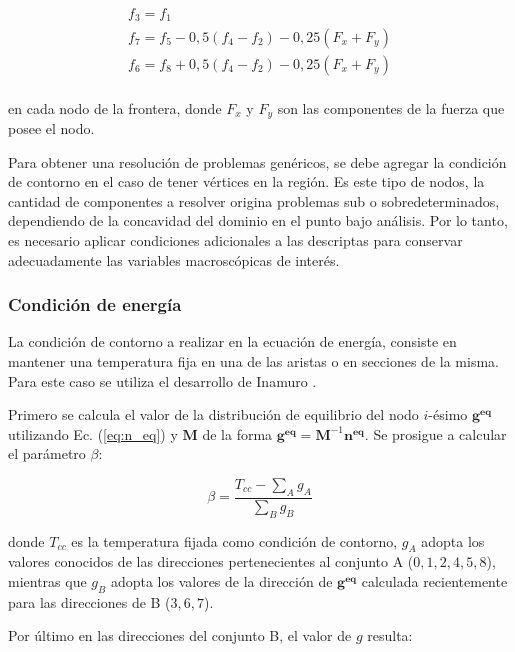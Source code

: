 \begin{equation}
\begin{array}{c}
f_{3} = f_{1}\\
f_{7} = f_{5} - 0,5 (f_{4} - f_{2}) - 0,25 (F_{x} + F_{y})\\
f_{6} = f_{8} + 0,5 (f_{4} - f_{2}) - 0,25 (F_{x} + F_{y})\\
\end{array}
\end{equation}

en cada nodo de la frontera, donde $F_{x}$ y  $F_{y}$ son las componentes de la fuerza que posee el nodo. 

Para obtener una resolución de problemas genéricos, se debe agregar la condición de contorno en el caso de tener vértices en la región. Es este tipo de nodos, la cantidad de componentes a resolver origina problemas sub o sobredeterminados, dependiendo de la concavidad del dominio en el punto bajo análisis. Por lo tanto, es necesario aplicar condiciones adicionales a las descriptas para conservar adecuadamente las variables macroscópicas de interés.

\subsubsection{Condición de energía}

La condición de contorno a realizar en la ecuación de energía, consiste en mantener una temperatura fija en una de las aristas o en secciones de la misma. Para este caso se utiliza el desarrollo de Inamuro \cite{inamuro2002lattice}.

Primero se calcula el valor de la distribución de equilibrio del nodo $i$-ésimo $\mathbf{g^{eq}}$ \\
utilizando Ec. (\ref{eq:n_eq}) y $\mathbf{M}$ de la forma $\mathbf{g^{eq}} = \mathbf{M}^{-1} \mathbf{n^{eq}}$. Se prosigue a calcular el parámetro $\beta$:

\begin{equation}
\beta = \frac{T_{cc} - \sum_{A} g_{A}}{\sum_{B} g_{B}}
\label{eq:beta}
\end{equation}

donde $T_{cc}$ es la temperatura fijada como condición de contorno, $g_{A}$ adopta los valores conocidos de las direcciones pertenecientes al conjunto A ($0, 1, 2, 4, 5, 8 $), mientras que $g_{B}$ adopta los valores de la dirección de $\mathbf{g^{eq}}$ calculada recientemente para las direcciones de B ($3, 6, 7$).

Por último en las direcciones del conjunto B, el valor de $g$ resulta:

